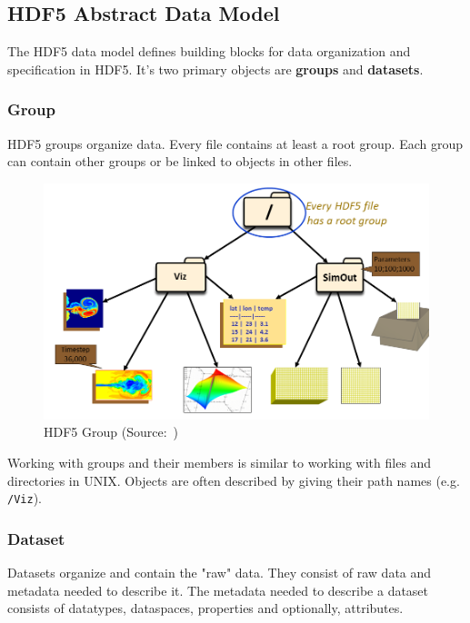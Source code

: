 \documentclass[thesis=M,english]{FITthesis}[2019/12/23]
\begin{document}
\subsection{HDF5 Abstract Data Model}

The HDF5 data model defines building blocks for data organization and specification in HDF5.
It's two primary objects are \textbf{groups} and \textbf{datasets}.

\subsubsection{Group}

HDF5 groups organize data. Every file contains at least a root group.
Each group can contain other groups or be linked to objects in other files.

\begin{figure}[!h]
    \centering
    \includegraphics[scale=0.3]{static/group.png}
    \caption{HDF5 Group (Source:~\cite{hdf5})}
\end{figure}

Working with groups and their members is similar to working with files and directories in UNIX.
Objects are often described by giving their path names (e.g. \texttt{/Viz}).

\subsubsection{Dataset}

Datasets organize and contain the "raw" data. They consist of raw data and metadata needed to describe it.
The metadata needed to describe a dataset consists of datatypes, dataspaces, properties and optionally,
attributes.
\end{document}
